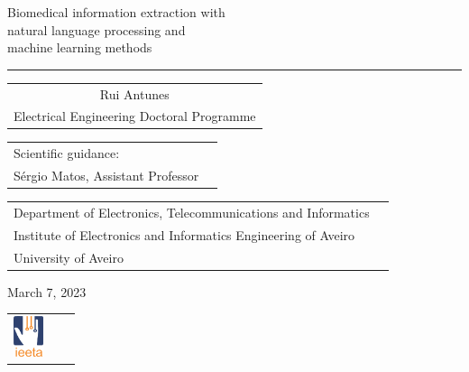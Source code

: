 \begin{frame}[t,plain]{Biomedical information extraction with\\ natural language processing and\\ machine learning methods}

\hrule


\begingroup
\begin{center}
\begin{tabular}{c}
{\large Rui Antunes}\\
{\scriptsize Electrical Engineering Doctoral Programme}
\end{tabular}
\end{center}

\tiny
\begin{tabular}{Ol}
Scientific guidance:\\
Sérgio Matos, Assistant Professor
\end{tabular}
\endgroup

\vspace*{2mm}

\begingroup
\tiny
\begin{tabular}{Ol}
Department of Electronics, Telecommunications and Informatics\\%
Institute of Electronics and Informatics Engineering of Aveiro\\%
University of Aveiro
\end{tabular}
\endgroup

\vspace*{4mm}

\begingroup
\tiny
March 7, 2023
\par\endgroup


\begin{center}
\begin{tabular}{@{\hskip40pt}D{17.1mm}OD{22.0mm}}
\includegraphics[height=12mm]{img/logos/ieeta.png} &
\end{tabular}
\end{center}

\end{frame}

